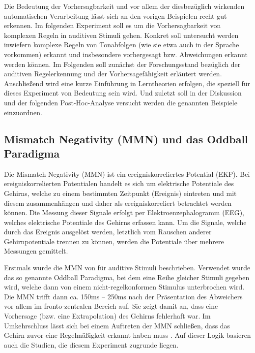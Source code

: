 \documentclass[doc,a4paper,12pt]{apa6}
\begin{document}

Die Bedeutung der Vorhersagbarkeit und vor allem der diesbezüglich wirkenden automatischen Verarbeitung lässt sich an den vorigen Beispielen recht gut erkennen. Im folgenden Experiment soll es um die Vorhersagbarkeit von komplexen Regeln in auditiven Stimuli gehen. Konkret soll untersucht werden inwiefern komplexe Regeln von Tonabfolgen (wie sie etwa auch in der Sprache vorkommen) erkannt und insbesondere vorhergesagt bzw. Abweichungen erkannt werden können. Im Folgenden soll zunächst der Forschungsstand bezüglich der auditiven Regelerkennung und der Vorhersagefähigkeit erläutert werden. Anschließend wird eine kurze Einführung in Lerntheorien erfolgen, die speziell für dieses Experiment von Bedeutung sein wird. Und zuletzt soll in der Diskussion und der folgenden Post-Hoc-Analyse versucht werden die genannten Beispiele einzuordnen.

\subsection{Mismatch Negativity (MMN) und das Oddball Paradigma}

Die Mismatch Negativity (MMN) ist ein ereigniskorreliertes Potential (EKP). Bei ereigniskorrelierten Potentialen handelt es sich um elektrische Potentiale des Gehirns, welche zu einem bestimmten Zeitpunkt (Ereignis) eintreten und mit diesem zusammenhängen und daher als ereigniskorreliert betrachtet werden können. Die Messung dieser Signale erfolgt per Elektroenzephalogramm (EEG), welches elektrische Potentiale des Gehirns erfassen kann. Um die Signale, welche durch das Ereignis ausgelöst werden, letztlich vom Rauschen anderer Gehirnpotentiale trennen zu können, werden die Potentiale über mehrere Messungen gemittelt.

Erstmals wurde die MMN von \textcite{naatanen1978early} für auditive Stimuli beschrieben. Verwendet wurde das so genannte Oddball Paradigma, bei dem eine Reihe gleicher Stimuli gegeben wird, welche dann von einem nicht-regelkonformen Stimulus unterbrochen wird. Die MMN trifft dann ca. 150ms – 250ms nach der Präsentation des Abweichers vor allem im fronto-zentralen Bereich auf. Sie zeigt damit an, dass eine Vorhersage (bzw. eine Extrapolation) des Gehirns fehlerhaft war. Im Umkehrschluss lässt sich bei einem Auftreten der MMN schließen, dass das Gehirn zuvor eine Regelmäßigkeit erkannt haben muss \parencite{schroger2007mismatch}. Auf dieser Logik basieren auch die Studien, die diesem Experiment zugrunde liegen.
\end{document}
